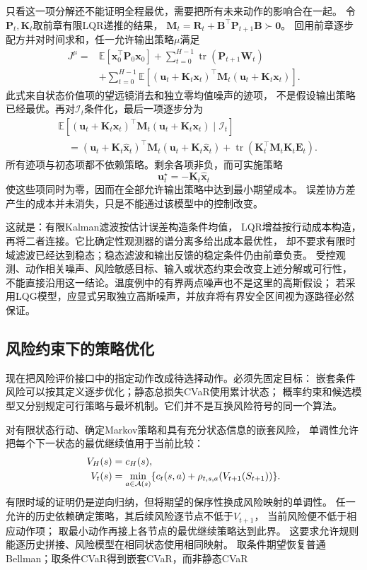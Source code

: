 只看这一项分解还不能证明全程最优，需要把所有未来动作的影响合在一起。
令$\bm P_t,\bm K_t$取前章有限LQR递推的结果，
$\bm M_t=\bm R_t+\bm B^\top\bm P_{t+1}\bm B\succ\bm0$。
回用前章逐步配方并对时间求和，任一允许输出策略$\mu$满足
\begin{align*}
  J^\mu={}&
    \mathbb E[\bm x_0^\top\bm P_0\bm x_0]
    +\sum_{t=0}^{H-1}\operatorname{tr}(\bm P_{t+1}\bm W_t)\\
    &+\sum_{t=0}^{H-1}\mathbb E[
      (\bm u_t+\bm K_t\bm x_t)^\top
      \bm M_t(\bm u_t+\bm K_t\bm x_t)].
\end{align*}
此式来自状态价值项的望远镜消去和独立零均值噪声的迹项，
不是假设输出策略已经最优。再对$\mathcal I_t$条件化，最后一项逐步分为
\begin{align*}
  &\mathbb E[
    (\bm u_t+\bm K_t\bm x_t)^\top\bm M_t
    (\bm u_t+\bm K_t\bm x_t)\mid\mathcal I_t]\\
  &\quad=
    (\bm u_t+\bm K_t\widehat{\bm x}_t)^\top\bm M_t
    (\bm u_t+\bm K_t\widehat{\bm x}_t)
    +\operatorname{tr}(\bm K_t^\top\bm M_t\bm K_t\bm E_t).
\end{align*}
所有迹项与初态项都不依赖策略。剩余各项非负，而可实施策略
\begin{equation}
  \bm u_t^\star=-\bm K_t\widehat{\bm x}_t
  \label{eq:policy-finite-lqg-feedback}
\end{equation}
使这些项同时为零，因而在全部允许输出策略中达到最小期望成本。
误差协方差产生的成本并未消失，只是不能通过该模型中的控制改变。

这就是：有限Kalman滤波按估计误差构造条件均值，
LQR增益按行动成本构造，再将二者连接。它比确定性观测器的谱分离多给出成本最优性，
却不要求有限时域滤波已经达到稳态；稳态滤波和输出反馈的稳定条件仍由前章负责。
受控观测、动作相关噪声、风险敏感目标、输入或状态约束会改变上述分解或可行性，
不能直接沿用这一结论。温度例中的有界两点噪声也不是这里的高斯假设；
若采用LQG模型，应显式另取独立高斯噪声，并放弃将有界安全区间视为逐路径必然保证。

\subsection{风险约束下的策略优化}
\label{sec:policy-risk-optimization}

现在把风险评价接口中的指定动作改成待选择动作。必须先固定目标：
嵌套条件风险可以按其定义逐步优化；静态总损失CVaR使用累计状态；
概率约束和候选模型又分别规定可行策略与最坏机制。它们并不是互换风险符号的同一个算法。

对有限状态行动、确定Markov策略和具有充分状态信息的嵌套风险，
单调性允许把每个下一状态的最优继续值用于当前比较：
\begin{align}
  V_H(s)&=c_H(s),\notag\\
  V_t(s)&=\min_{a\in\mathcal A(s)}
    \{c_t(s,a)+\rho_{t,s,a}(V_{t+1}(S_{t+1}))\}.
  \label{eq:decision-risk-bellman-finite}
\end{align}
有限时域的证明仍是逆向归纳，但将期望的保序性换成风险映射的单调性。
任一允许的历史依赖确定策略，其后续风险逐节点不低于$V_{t+1}$，
当前风险便不低于相应动作项；
取最小动作再接上各节点的最优继续策略达到此界。
这要求允许规则能逐历史拼接、风险模型在相同状态使用相同映射。
取条件期望恢复普通Bellman；取条件CVaR得到嵌套CVaR，而非静态CVaR

